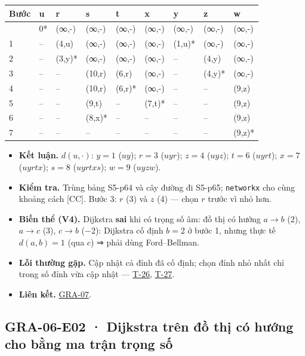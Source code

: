 \documentclass[
  10pt,
  twoside,openany]{book}
\providecommand{\tightlist}{%
  \setlength{\itemsep}{0pt}\setlength{\parskip}{0pt}}
\begin{document}
\begin{longtable}[]{@{}lllllllll@{}}
\toprule\noalign{}
Bước & u & r & s & t & x & y & z & w \\
\midrule\noalign{}
\endhead
\bottomrule\noalign{}
\endlastfoot
0 & 0* & (∞,-) & (∞,-) & (∞,-) & (∞,-) & (∞,-) & (∞,-) & (∞,-) \\
1 & -- & (4,u) & (∞,-) & (∞,-) & (∞,-) & (1,u)* & (∞,-) & (∞,-) \\
2 & -- & (3,y)* & (∞,-) & (∞,-) & (∞,-) & -- & (4,y) & (∞,-) \\
3 & -- & -- & (10,r) & (6,r) & (∞,-) & -- & (4,y)* & (∞,-) \\
4 & -- & -- & (10,r) & (6,r)* & (∞,-) & -- & -- & (9,z) \\
5 & -- & -- & (9,t) & -- & (7,t)* & -- & -- & (9,z) \\
6 & -- & -- & (8,x)* & -- & -- & -- & -- & (9,z) \\
7 & -- & -- & -- & -- & -- & -- & -- & (9,z)* \\
\end{longtable}

\begin{itemize}
\tightlist
\item
  \textbf{Kết luận.} \(d(u,\cdot)\): \(y=1\) (\(u y\)); \(r=3\)
  (\(u y r\)); \(z=4\) (\(u y z\)); \(t=6\) (\(u y r t\)); \(x=7\)
  (\(u y r t x\)); \(s=8\) (\(u y r t x s\)); \(w=9\) (\(u y z w\)).
\item
  \textbf{Kiểm tra.} Trùng bảng S5-p64 và cây đường đi S5-p65;
  \texttt{networkx} cho cùng khoảng cách {[}CC{]}. Bước 3: \(r\) (3) và
  \(z\) (4) --- chọn \(r\) trước vì nhỏ hơn.
\item
  \textbf{Biến thể (V4).} Dijkstra \textbf{sai} khi có trọng số âm: đồ
  thị có hướng \(a\to b\) (2), \(a\to c\) (3), \(c\to b\) (−2): Dijkstra
  cố định \(b=2\) ở bước 1, nhưng thực tế \(d(a,b)=1\) (qua \(c\)) ⇒
  phải dùng Ford--Bellman.
\item
  \textbf{Lỗi thường gặp.} Cập nhật cả đỉnh đã cố định; chọn đỉnh nhỏ
  nhất chỉ trong số đỉnh vừa cập nhật ---
  \protect\hyperlink{T-26}{T-26}, \protect\hyperlink{T-27}{T-27}.
\item
  \textbf{Liên kết.} \protect\hyperlink{GRA-07}{GRA-07}.
\end{itemize}

\hypertarget{GRA-06-E02}{%
\subsection{GRA-06-E02 · Dijkstra trên đồ thị có hướng cho bằng ma trận
trọng số}\label{GRA-06-E02}}
\end{document}
